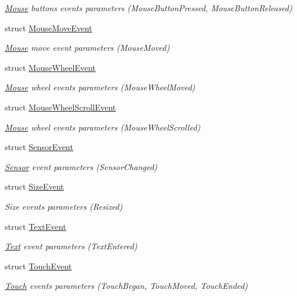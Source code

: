 \begin{DoxyCompactItemize}
\begin{DoxyCompactList}\small\item\em \hyperlink{classsf_1_1_mouse}{Mouse} buttons events parameters (Mouse\+Button\+Pressed, Mouse\+Button\+Released) \end{DoxyCompactList}\item 
struct \hyperlink{structsf_1_1_event_1_1_mouse_move_event}{Mouse\+Move\+Event}
\begin{DoxyCompactList}\small\item\em \hyperlink{classsf_1_1_mouse}{Mouse} move event parameters (Mouse\+Moved) \end{DoxyCompactList}\item 
struct \hyperlink{structsf_1_1_event_1_1_mouse_wheel_event}{Mouse\+Wheel\+Event}
\begin{DoxyCompactList}\small\item\em \hyperlink{classsf_1_1_mouse}{Mouse} wheel events parameters (Mouse\+Wheel\+Moved) \end{DoxyCompactList}\item 
struct \hyperlink{structsf_1_1_event_1_1_mouse_wheel_scroll_event}{Mouse\+Wheel\+Scroll\+Event}
\begin{DoxyCompactList}\small\item\em \hyperlink{classsf_1_1_mouse}{Mouse} wheel events parameters (Mouse\+Wheel\+Scrolled) \end{DoxyCompactList}\item 
struct \hyperlink{structsf_1_1_event_1_1_sensor_event}{Sensor\+Event}
\begin{DoxyCompactList}\small\item\em \hyperlink{classsf_1_1_sensor}{Sensor} event parameters (Sensor\+Changed) \end{DoxyCompactList}\item 
struct \hyperlink{structsf_1_1_event_1_1_size_event}{Size\+Event}
\begin{DoxyCompactList}\small\item\em Size events parameters (Resized) \end{DoxyCompactList}\item 
struct \hyperlink{structsf_1_1_event_1_1_text_event}{Text\+Event}
\begin{DoxyCompactList}\small\item\em \hyperlink{classsf_1_1_text}{Text} event parameters (Text\+Entered) \end{DoxyCompactList}\item 
struct \hyperlink{structsf_1_1_event_1_1_touch_event}{Touch\+Event}
\begin{DoxyCompactList}\small\item\em \hyperlink{classsf_1_1_touch}{Touch} events parameters (Touch\+Began, Touch\+Moved, Touch\+Ended) \end{DoxyCompactList}\end{DoxyCompactItemize}
